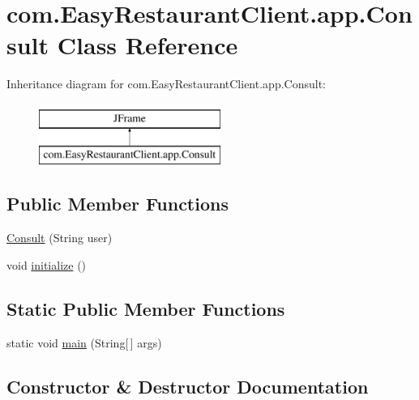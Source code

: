 \hypertarget{classcom_1_1_easy_restaurant_client_1_1app_1_1_consult}{}\section{com.\+Easy\+Restaurant\+Client.\+app.\+Consult Class Reference}
\label{classcom_1_1_easy_restaurant_client_1_1app_1_1_consult}
Inheritance diagram for com.\+Easy\+Restaurant\+Client.\+app.\+Consult\+:\begin{figure}[H]
\begin{center}
\leavevmode
\includegraphics[height=2.000000cm]{classcom_1_1_easy_restaurant_client_1_1app_1_1_consult}
\end{center}
\end{figure}
\subsection*{Public Member Functions}
\begin{DoxyCompactItemize}
\item 
\mbox{\hyperlink{classcom_1_1_easy_restaurant_client_1_1app_1_1_consult_a1150c56544f05a438b52aaed4a988606}{Consult}} (String user)
\item 
void \mbox{\hyperlink{classcom_1_1_easy_restaurant_client_1_1app_1_1_consult_a1323f2e42263ed30e6195a7460873074}{initialize}} ()
\end{DoxyCompactItemize}
\subsection*{Static Public Member Functions}
\begin{DoxyCompactItemize}
\item 
static void \mbox{\hyperlink{classcom_1_1_easy_restaurant_client_1_1app_1_1_consult_acc89a312a5111b16064df1a3b042f59b}{main}} (String\mbox{[}$\,$\mbox{]} args)
\end{DoxyCompactItemize}


\subsection{Constructor \& Destructor Documentation}
\mbox{\label{classcom_1_1_easy_restaurant_client_1_1app_1_1_consult_a1150c56544f05a438b52aaed4a988606}} 
